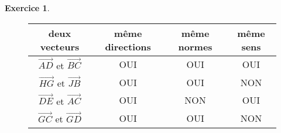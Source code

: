 \documentclass[a4paper,10pt]{article}
\theoremstyle{definition}
\newtheorem{exo}{Exercice}
\newcommand{\V}{\overrightarrow}
\begin{document}
\begin{exo}
\begin{figure}[h!]
\begin{minipage}[c]{0.35\linewidth}
				\end{minipage}
				\hfill\vrule\hfill
				\begin{minipage}[c]{0.52\linewidth}
					{\renewcommand{\arraystretch}{2} 
						\begin{tabular}{|c|c|c|c|} 
							\hline
							deux vecteurs & même directions & même normes & même sens\\
							\hline
							$\V{AD}$ et $\V{BC}$ & OUI& OUI & OUI\\
							\hline 
							$\V{HG}$ et $\V{JB}$ & OUI & OUI  & NON\\
							\hline 
							$\V{DE}$ et $\V{AC}$ & OUI & NON & OUI\\
							\hline 
							$\V{GC}$ et $\V{GD}$ & OUI & OUI & NON\\
							\hline 
					\end{tabular}}
				\end{minipage}
			\end{figure}
\end{exo}
\end{document}

